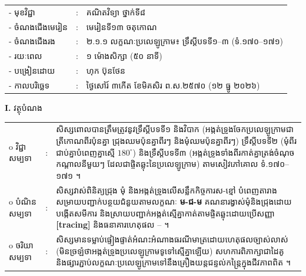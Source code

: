 \documentclass[a4paper,10pt]{article}
\newcommand{\wcirc}{{\CourierBullet\fontsize{9.5pt}{11pt}\selectfont o}}
\newcommand{\cnum}[1]{{\fontsize{10.5pt}{12pt}\selectfont\ding{\numexpr171+#1\relax}}\hspace{0.2em}}
\begin{document}
{\renewcommand{\arraystretch}{0.95}
\hspace*{4.05cm}%
\begin{tabular}{@{}l l l@{}}
  - \hspace{0.35cm} មុខវិជ្ជា & : & គណិតវិទ្យា ថ្នាក់ទី៨ \\
  - \hspace{0.35cm} ចំណងជើងមេរៀន & : & មេរៀនទី១៣ ចតុកោណ \\
  - \hspace{0.35cm} ចំណងជើងរង & : & ២.១.១ លក្ខណៈប្រលេឡូក្រាម៖ ទ្រឹស្ដីបទទី១--៣ (ទំ.១៧០--១៧១) \\
  - \hspace{0.35cm} រយៈពេល & : & ១ ម៉ោងសិក្សា (៥០ នាទី) \\
  - \hspace{0.35cm} បង្រៀនដោយ & : & ហុក ប៊ុនថែន \\
  - \hspace{0.35cm} កាលបរិច្ឆេទ & : & ថ្ងៃសៅរ៍ ៣កើត ខែមិគសិរ ព.ស.២៥៧០ (១២ ធ្នូ ២០២៦) \\
\end{tabular}

\vspace{1pt}

\textbf{I.} {\muol វត្ថុបំណង}\\[1pt]
\hspace*{0.55cm}%
\begin{tabular}{@{}l l L{14.2cm}@{}}
  \wcirc \hspace{0.25cm} វិជ្ជាសម្បទា & : & សិស្សពោលបានត្រឹមត្រូវនូវទ្រឹស្ដីបទទី១ និងវិបាក (អង្កត់ទ្រូងចែកប្រលេឡូក្រាមជាត្រីកោណពីរប៉ុនគ្នា ជ្រុងឈមប៉ុនគ្នាពីរៗ និងមុំឈមប៉ុនគ្នាពីរៗ) ទ្រឹស្ដីបទទី២ (មុំពីរជាប់គ្នាបំពេញគ្នាស្មើ $180^\circ$) និងទ្រឹស្ដីបទទី៣ (អង្កត់ទ្រូងទាំងពីរកាត់គ្នាត្រង់ចំណុចកណ្ដាលនីមួយៗ ដែលជាផ្ចិតឆ្លុះនៃប្រលេឡូក្រាម) តាមសៀវភៅគោល ទំ.១៧០--១៧១ ។ \\
  \wcirc \hspace{0.25cm} បំណិនសម្បទា & : & សិស្សវាស់ពិនិត្យជ្រុង មុំ និងអង្កត់ទ្រូងលើសន្លឹកកិច្ចការស-ខ្មៅ បំពេញតារាងសម្រាយបញ្ជាក់បន្ថយជំនួយតាមលក្ខណៈ \textbf{ម-ជ-ម} គណនារង្វាស់មុំនិងជ្រុងដោយបង្កើតសមីការ និងស្រាយបញ្ជាក់អង្កត់ស្មើគ្នាកាត់តាមផ្ចិតឆ្លុះដោយប្រើសញ្ញា \textbf{[tracing]} និងធនាគារហេតុផល \cnum{1}--\cnum{5} ។ \\
  \wcirc \hspace{0.25cm} ចរិយាសម្បទា & : & សិស្សមានទម្លាប់ផ្ទៀងផ្ទាត់អំណះអំណាងធរណីមាត្រដោយហេតុផលច្បាស់លាស់ (មិនច្រឡំថាអង្កត់ទ្រូងប្រលេឡូក្រាមទូទៅស្មើគ្នាឡើយ) សហការពិភាក្សាជាដៃគូ និងផ្សារភ្ជាប់លក្ខណៈប្រលេឡូក្រាមទៅនឹងគ្រឿងយន្តជន្ទល់កន្ត្រៃក្នុងជីវភាពពិត ។ \\
\end{tabular}

}
\end{document}
